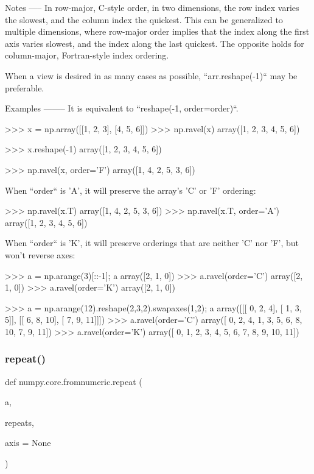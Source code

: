 \begin{DoxyVerb}
Notes
-----
In row-major, C-style order, in two dimensions, the row index
varies the slowest, and the column index the quickest.  This can
be generalized to multiple dimensions, where row-major order
implies that the index along the first axis varies slowest, and
the index along the last quickest.  The opposite holds for
column-major, Fortran-style index ordering.

When a view is desired in as many cases as possible, ``arr.reshape(-1)``
may be preferable.

Examples
--------
It is equivalent to ``reshape(-1, order=order)``.

>>> x = np.array([[1, 2, 3], [4, 5, 6]])
>>> np.ravel(x)
array([1, 2, 3, 4, 5, 6])

>>> x.reshape(-1)
array([1, 2, 3, 4, 5, 6])

>>> np.ravel(x, order='F')
array([1, 4, 2, 5, 3, 6])

When ``order`` is 'A', it will preserve the array's 'C' or 'F' ordering:

>>> np.ravel(x.T)
array([1, 4, 2, 5, 3, 6])
>>> np.ravel(x.T, order='A')
array([1, 2, 3, 4, 5, 6])

When ``order`` is 'K', it will preserve orderings that are neither 'C'
nor 'F', but won't reverse axes:

>>> a = np.arange(3)[::-1]; a
array([2, 1, 0])
>>> a.ravel(order='C')
array([2, 1, 0])
>>> a.ravel(order='K')
array([2, 1, 0])

>>> a = np.arange(12).reshape(2,3,2).swapaxes(1,2); a
array([[[ 0,  2,  4],
        [ 1,  3,  5]],
       [[ 6,  8, 10],
        [ 7,  9, 11]]])
>>> a.ravel(order='C')
array([ 0,  2,  4,  1,  3,  5,  6,  8, 10,  7,  9, 11])
>>> a.ravel(order='K')
array([ 0,  1,  2,  3,  4,  5,  6,  7,  8,  9, 10, 11])\end{DoxyVerb}
 \mbox{\label{namespacenumpy_1_1core_1_1fromnumeric_a59a57b8330d6d31653a0bd208323fe2a}} 
\subsubsection{\texorpdfstring{repeat()}{repeat()}}
{\footnotesize\ttfamily def numpy.\+core.\+fromnumeric.\+repeat (\begin{DoxyParamCaption}\item[{}]{a,  }\item[{}]{repeats,  }\item[{}]{axis = {\ttfamily None} }\end{DoxyParamCaption})}

